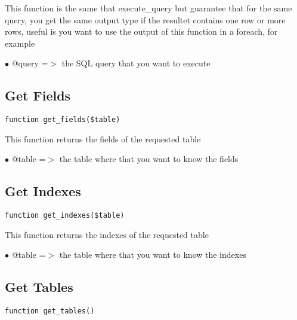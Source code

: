 \documentclass[a4paper]{book}
\begin{document}
This function is the same that execute\_query but guarantee that for the
same query, you get the same output type if the resultet contains one
row or more rows, useful is you want to use the output of this function
in a foreach, for example

\begin{compactitem}
\item[\color{myblue}$\bullet$] @query =$>$ the SQL query that you want to execute
\end{compactitem}

\hypertarget{toc246}{}
\subsection{Get Fields}

\begin{lstlisting}
function get_fields($table)
\end{lstlisting}

This function returns the fields of the requested table

\begin{compactitem}
\item[\color{myblue}$\bullet$] @table =$>$ the table where that you want to know the fields
\end{compactitem}

\hypertarget{toc247}{}
\subsection{Get Indexes}

\begin{lstlisting}
function get_indexes($table)
\end{lstlisting}

This function returns the indexes of the requested table

\begin{compactitem}
\item[\color{myblue}$\bullet$] @table =$>$ the table where that you want to know the indexes
\end{compactitem}

\hypertarget{toc248}{}
\subsection{Get Tables}

\begin{lstlisting}
function get_tables()
\end{lstlisting}
\end{document}
